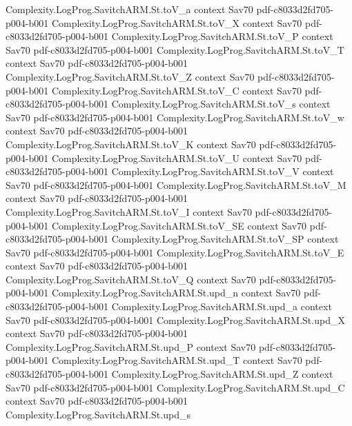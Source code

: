 \begin{theorem}
\proofstep
  {Complexity.LogProg.SavitchARM.St.toV_a}
  {context}
  {Sav70}
  {pdf-c8033d2fd705-p004-b001}
\proofstep
  {Complexity.LogProg.SavitchARM.St.toV_X}
  {context}
  {Sav70}
  {pdf-c8033d2fd705-p004-b001}
\proofstep
  {Complexity.LogProg.SavitchARM.St.toV_P}
  {context}
  {Sav70}
  {pdf-c8033d2fd705-p004-b001}
\proofstep
  {Complexity.LogProg.SavitchARM.St.toV_T}
  {context}
  {Sav70}
  {pdf-c8033d2fd705-p004-b001}
\proofstep
  {Complexity.LogProg.SavitchARM.St.toV_Z}
  {context}
  {Sav70}
  {pdf-c8033d2fd705-p004-b001}
\proofstep
  {Complexity.LogProg.SavitchARM.St.toV_C}
  {context}
  {Sav70}
  {pdf-c8033d2fd705-p004-b001}
\proofstep
  {Complexity.LogProg.SavitchARM.St.toV_s}
  {context}
  {Sav70}
  {pdf-c8033d2fd705-p004-b001}
\proofstep
  {Complexity.LogProg.SavitchARM.St.toV_w}
  {context}
  {Sav70}
  {pdf-c8033d2fd705-p004-b001}
\proofstep
  {Complexity.LogProg.SavitchARM.St.toV_K}
  {context}
  {Sav70}
  {pdf-c8033d2fd705-p004-b001}
\proofstep
  {Complexity.LogProg.SavitchARM.St.toV_U}
  {context}
  {Sav70}
  {pdf-c8033d2fd705-p004-b001}
\proofstep
  {Complexity.LogProg.SavitchARM.St.toV_V}
  {context}
  {Sav70}
  {pdf-c8033d2fd705-p004-b001}
\proofstep
  {Complexity.LogProg.SavitchARM.St.toV_M}
  {context}
  {Sav70}
  {pdf-c8033d2fd705-p004-b001}
\proofstep
  {Complexity.LogProg.SavitchARM.St.toV_I}
  {context}
  {Sav70}
  {pdf-c8033d2fd705-p004-b001}
\proofstep
  {Complexity.LogProg.SavitchARM.St.toV_SE}
  {context}
  {Sav70}
  {pdf-c8033d2fd705-p004-b001}
\proofstep
  {Complexity.LogProg.SavitchARM.St.toV_SP}
  {context}
  {Sav70}
  {pdf-c8033d2fd705-p004-b001}
\proofstep
  {Complexity.LogProg.SavitchARM.St.toV_E}
  {context}
  {Sav70}
  {pdf-c8033d2fd705-p004-b001}
\proofstep
  {Complexity.LogProg.SavitchARM.St.toV_Q}
  {context}
  {Sav70}
  {pdf-c8033d2fd705-p004-b001}
\proofstep
  {Complexity.LogProg.SavitchARM.St.upd_n}
  {context}
  {Sav70}
  {pdf-c8033d2fd705-p004-b001}
\proofstep
  {Complexity.LogProg.SavitchARM.St.upd_a}
  {context}
  {Sav70}
  {pdf-c8033d2fd705-p004-b001}
\proofstep
  {Complexity.LogProg.SavitchARM.St.upd_X}
  {context}
  {Sav70}
  {pdf-c8033d2fd705-p004-b001}
\proofstep
  {Complexity.LogProg.SavitchARM.St.upd_P}
  {context}
  {Sav70}
  {pdf-c8033d2fd705-p004-b001}
\proofstep
  {Complexity.LogProg.SavitchARM.St.upd_T}
  {context}
  {Sav70}
  {pdf-c8033d2fd705-p004-b001}
\proofstep
  {Complexity.LogProg.SavitchARM.St.upd_Z}
  {context}
  {Sav70}
  {pdf-c8033d2fd705-p004-b001}
\proofstep
  {Complexity.LogProg.SavitchARM.St.upd_C}
  {context}
  {Sav70}
  {pdf-c8033d2fd705-p004-b001}
\proofstep
  {Complexity.LogProg.SavitchARM.St.upd_s}

\end{theorem}
